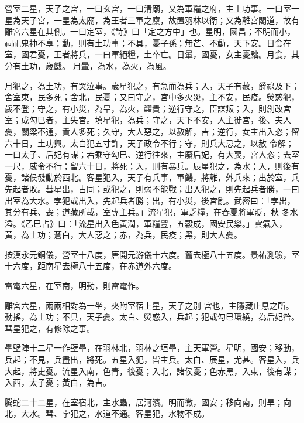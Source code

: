 \begin{pinyinscope}
 營室二星，天子之宮，一曰玄宮，一曰清廟，又為軍糧之府，主土功事。一曰室一星為天子宮，一星為太廟，為王者三軍之廩，故置羽林以衛；又為離宮閣道，故有離宮六星在其側。一曰定室，《詩》曰「定之方中」也。星明，國昌；不明而小，祠祀鬼神不享；動，則有土功事；不具，憂子孫；無芒、不動，天下安。日食在室，國君憂，王者將兵，一曰軍絕糧，土卒亡。日暈，國憂，女主憂黜。月食，其分有土功，歲饑。
 月暈，為水，為火，為風。



 月犯之，為土功，有哭泣事。歲星犯之，有急而為兵；入，天子有赦，爵祿及下；舍室東，民多死；舍北，民憂；又曰守之，宮中多火災，主不安，民疫。熒惑犯，歲不登；守之，有小災，為旱，為火，糴貴；逆行守之，臣謀叛；入，則創改宮室；成勾巳者，主失宮。填星犯，為兵；守之，天下不安，人主徙宮，後、夫人憂，關梁不通，貴人多死；久守，大人惡之，以赦解，吉；逆行，女主出入恣；留六十日，土功興。太白犯五寸許，天子政令不行；守，則兵大忌之，以赦
 令解；一曰太子、后妃有謀；若乘守勾巳、逆行往來，主廢后妃，有大喪，宮人恣；去室一尺，威令不行；留六十日，將死；入，則有暴兵。辰星犯之，為水；入，則後有憂，諸侯發動於西北。客星犯入，天子有兵事，軍饑，將離，外兵來；出於室，兵先起者敗。彗星出，占同；或犯之，則弱不能戰；出入犯之，則先起兵者勝，一曰出室為大水。孛犯或出入，先起兵者勝；出，有小災，後宮亂。武密曰：「孛出，其分有兵、喪；道藏所載，室專主兵。」流星犯，軍乏糧，在春夏將軍貶，秋
 冬水溢。《乙巳占》曰：「流星出入色黃潤，軍糧豐，五穀成，國安民樂。」雲氣入，黃，為土功；蒼白，大人惡之；赤，為兵，民疫；黑，則大人憂。



 按漢永元銅儀，營室十八度，唐開元游儀十六度。舊去極八十五度。景祐測驗，室十六度，距南星去極八十五度，在赤道外六度。



 雷電六星，在室南，明動，則雷電作。



 離宮六星，兩兩相對為一坐，夾附室宿上星，天子之別
 宮也，主隱藏止息之所。動搖，為土功；不具，天子憂。太白、熒惑入，兵起；犯或勾巳環繞，為后妃咎。彗星犯之，有修除之事。



 壘壁陣十二星一作壁壘，在羽林北，羽林之垣壘，主天軍營。星明，國安；移動，兵起；不見，兵盡出，將死。五星入犯，皆主兵。太白、辰星，尤甚。客星入，兵大起，將吏憂。流星入南，色青，後憂；入北，諸侯憂；色赤黑，入東，後有謀；入西，太子憂；黃白，為吉。



 騰蛇二十二星，在室宿北，主水蟲，居河濱。明而微，國安；移向南，則旱；向北，大水。彗、孛犯之，水道不通。客星犯，水物不成。




\end{pinyinscope}
